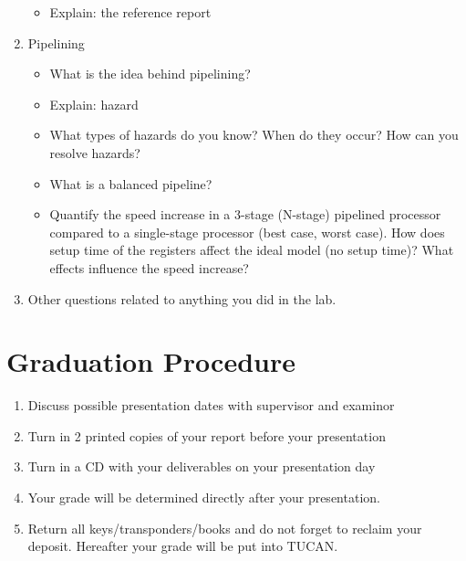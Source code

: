 \begin{enumerate}
\begin{itemize}
			\item Explain: the reference report
			\end{itemize}
		\item Pipelining
			\begin{itemize}			
			\item What is the idea behind pipelining?
			\item Explain: hazard
			\item What types of hazards do you know? When do they occur? How can you resolve hazards?
			\item What is a balanced pipeline?
			\item Quantify the speed increase in a 3-stage (N-stage) pipelined processor compared to a single-stage processor (best case, worst case). How does setup time of the registers affect the ideal model (no setup time)? What effects influence the speed increase?
			\end{itemize}
		\item Other questions related to anything you did in the lab.
\end{enumerate}

\newpage
\section{Graduation Procedure}
\begin{enumerate}
	\item Discuss possible presentation dates with supervisor and examinor
	\item Turn in 2 printed copies of your report before your presentation
	\item Turn in a CD with your deliverables on your presentation day
	\item Your grade will be determined directly after your presentation.
	\item Return all keys/transponders/books and do not forget to reclaim your deposit. Hereafter your grade will be put into TUCAN.
\end{enumerate}
